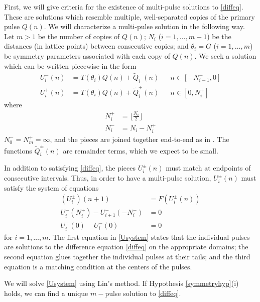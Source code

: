 \documentclass[12pt]{article}
\begin{document}
First, we will give criteria for the existence of multi-pulse solutions to \eqref{diffeq}. These are solutions which resemble multiple, well-separated copies of the primary pulse $Q(n)$. We will characterize a multi-pulse solution in the following way. Let $m > 1$ be the number of copies of $Q(n)$; $N_i$ ($i = 1, \dots, m-1$) be the distances (in lattice points) between consecutive copies; and $\theta_i = G$ ($i = 1, \dots, m$) be symmetry parameters associated with each copy of $Q(n)$. We seek a solution which can be written piecewise in the form 
\begin{align}\label{Upiecewise}
U_i^-(n) &= T(\theta_i) Q(n) + \tilde{Q}_i^-(n) && n \in [-N_{i-1}^-, 0] \\
U_i^+(n) &= T(\theta_i) Q(n) + \tilde{Q}_i^+(n) && n \in [0, N_i^+]
\end{align}
where 
\begin{equation}\label{Nipm}
\begin{aligned}
N_i^+ &= \lfloor \frac{N_i}{2} \rfloor \\
N_i^- &= N_i - N_i^+
\end{aligned}
\end{equation}
$N_0^- = N_m^+ = \infty$, and the pieces are joined together end-to-end as in \cite{Sandstede1998}. The functions $\tilde{Q}_i^\pm(n)$ are remainder terms, which we expect to be small.

In addition to satisfying \eqref{diffeq}, the pieces $U_i^\pm(n)$ must match at endpoints of consecutive intervals. Thus, in order to have a multi-pulse solution, $U_i^\pm(n)$ must satisfy the system of equations
\begin{equation}\label{Usystem}
\begin{aligned}
(U_i^\pm)(n+1) &= F(U_i^\pm(n))  \\
U_i^+(N_i^+) - U_{i+1}^-(-N_i^-) &= 0 \\
U_i^+(0) - U_i^-(0) &= 0
\end{aligned}
\end{equation}
for $i = 1, \dots, m$. The first equation in \eqref{Usystem} states that the individual pulses are solutions to the difference equation \eqref{diffeq} on the appropriate domains; the second equation glues together the individual pulses at their tails; and the third equation is a matching condition at the centers of the pulses.

We will solve \eqref{Usystem} using Lin's method. If Hypothesis \ref{symmetryhyp}(i) holds, we can find a unique $m-$pulse solution to \eqref{diffeq}.
\end{document}
